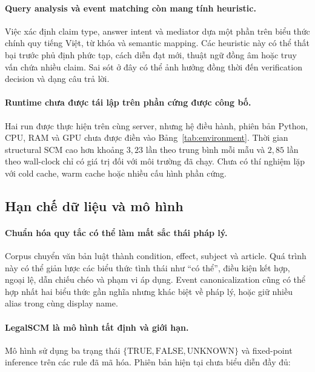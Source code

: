 \paragraph{Query analysis và event matching còn mang tính heuristic.}

Việc xác định claim type, answer intent và mediator dựa một phần trên biểu
thức chính quy tiếng Việt, từ khóa và semantic mapping. Các heuristic này có
thể thất bại trước phủ định phức tạp, cách diễn đạt mới, thuật ngữ đồng âm
hoặc truy vấn chứa nhiều claim. Sai sót ở đây có thể ảnh hưởng đồng thời đến
verification decision và dạng câu trả lời.

\paragraph{Runtime chưa được tái lập trên phần cứng được công bố.}

Hai run được thực hiện trên cùng server, nhưng hệ điều hành, phiên bản
Python, CPU, RAM và GPU chưa được điền vào Bảng~\ref{tab:environment}. Thời
gian structural SCM cao hơn khoảng $3{,}23$ lần theo trung bình mỗi mẫu và
$2{,}85$ lần theo wall-clock chỉ có giá trị đối với môi trường đã chạy. Chưa
có thí nghiệm lặp với cold cache, warm cache hoặc nhiều cấu hình phần cứng.

\subsection{Hạn chế dữ liệu và mô hình}

\paragraph{Chuẩn hóa quy tắc có thể làm mất sắc thái pháp lý.}

Corpus chuyển văn bản luật thành condition, effect, subject và article.
Quá trình này có thể giản lược các biểu thức tình thái như ``có thể'', điều
kiện kết hợp, ngoại lệ, dẫn chiếu chéo và phạm vi áp dụng. Event
canonicalization cũng có thể hợp nhất hai biểu thức gần nghĩa nhưng khác
biệt về pháp lý, hoặc giữ nhiều alias trong cùng display name.

\paragraph{LegalSCM là mô hình tất định và giới hạn.}

Mô hình sử dụng ba trạng thái
$\{\mathrm{TRUE},\mathrm{FALSE},\mathrm{UNKNOWN}\}$ và fixed-point
inference trên các rule đã mã hóa. Phiên bản hiện tại chưa biểu diễn đầy đủ:

